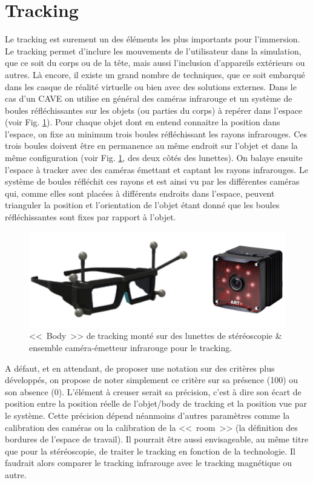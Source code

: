 	\section{Tracking}
	\par Le tracking est surement un des éléments les plus importants pour l'immersion. Le tracking permet d'inclure les mouvements de l'utilisateur dans la simulation, que ce soit du corps ou de la tête, mais aussi l'inclusion d'appareils extérieurs ou autres. Là encore, il existe un grand nombre de techniques, que ce soit embarqué dans les casque de réalité virtuelle ou bien avec des solutions externes. Dans le cas d'un CAVE on utilise en général des caméras infrarouge et un système de boules réfléchissantes sur les objets (ou parties du corps) à repérer dans l'espace (voir Fig. \ref{fig:tracking_illustration}). Pour chaque objet dont en entend connaitre la position dans l'espace, on fixe au minimum trois boules réfléchissant les rayons infrarouges. Ces trois boules doivent être en permanence au même endroit sur l'objet et dans la même configuration (voir Fig. \ref{fig:tracking_illustration}, des deux côtés des lunettes). On balaye ensuite l'espace à tracker avec des caméras émettant et captant les rayons infrarouges. Le système de boules réfléchit ces rayons et est ainsi vu par les différentes caméras qui, comme elles sont placées à différents endroits dans l'espace, peuvent trianguler la position et l'orientation de l'objet étant donné que les boules réfléchissantes sont fixes par rapport à l'objet.
	
	\begin{figure}
		\centering
		\includegraphics[scale=.6]{Figures/TrackingCameraBody}
		\caption{<<~Body~>> de tracking monté sur des lunettes de stéréoscopie \& ensemble caméra-émetteur infrarouge pour le tracking.}
		\label{fig:tracking_illustration}
	\end{figure}
	
	\par A défaut, et en attendant, de proposer une notation sur des critères plus développés, on propose de noter simplement ce critère sur sa présence (100) ou son absence (0). L'élément à creuser serait sa précision, c'est à dire son écart de position entre la position réelle de l'objet/body de tracking et la position vue par le système. Cette précision dépend néanmoins d'autres paramètres comme la calibration des caméras ou la calibration de la <<~room~>> (la définition des bordures de l'espace de travail). Il pourrait être aussi envisageable, au même titre que pour la stéréoscopie, de traiter le tracking en fonction de la technologie. Il faudrait alors comparer le tracking infrarouge avec le tracking magnétique ou autre.
		
